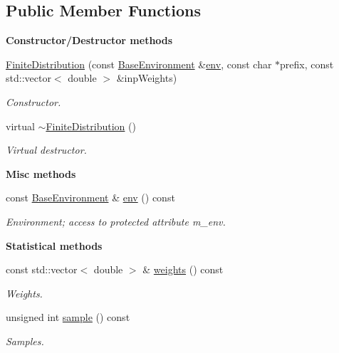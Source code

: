 \subsection*{Public Member Functions}
\begin{Indent}{\bf Constructor/\-Destructor methods}\par
\begin{DoxyCompactItemize}
\item 
\hyperlink{class_q_u_e_s_o_1_1_finite_distribution_a4aacd4bec1089ae18cb5026012b5f636}{Finite\-Distribution} (const \hyperlink{class_q_u_e_s_o_1_1_base_environment}{Base\-Environment} \&\hyperlink{class_q_u_e_s_o_1_1_finite_distribution_a9ebc6c7cea43a32f794c55650bee5a95}{env}, const char $\ast$prefix, const std\-::vector$<$ double $>$ \&inp\-Weights)
\begin{DoxyCompactList}\small\item\em Constructor. \end{DoxyCompactList}\item 
virtual \hyperlink{class_q_u_e_s_o_1_1_finite_distribution_a963dca0b57a4abdab775f92aa0a80a8d}{$\sim$\-Finite\-Distribution} ()
\begin{DoxyCompactList}\small\item\em Virtual destructor. \end{DoxyCompactList}\end{DoxyCompactItemize}
\end{Indent}
\begin{Indent}{\bf Misc methods}\par
\begin{DoxyCompactItemize}
\item 
const \hyperlink{class_q_u_e_s_o_1_1_base_environment}{Base\-Environment} \& \hyperlink{class_q_u_e_s_o_1_1_finite_distribution_a9ebc6c7cea43a32f794c55650bee5a95}{env} () const 
\begin{DoxyCompactList}\small\item\em Environment; access to protected attribute m\-\_\-env. \end{DoxyCompactList}\end{DoxyCompactItemize}
\end{Indent}
\begin{Indent}{\bf Statistical methods}\par
\begin{DoxyCompactItemize}
\item 
const std\-::vector$<$ double $>$ \& \hyperlink{class_q_u_e_s_o_1_1_finite_distribution_af226db41d7abbb8403d87d56159e7b71}{weights} () const 
\begin{DoxyCompactList}\small\item\em Weights. \end{DoxyCompactList}\item 
unsigned int \hyperlink{class_q_u_e_s_o_1_1_finite_distribution_afe4d105b0ffa6c629118239dcc35eb49}{sample} () const 
\begin{DoxyCompactList}\small\item\em Samples. \end{DoxyCompactList}\end{DoxyCompactItemize}
\end{Indent}
